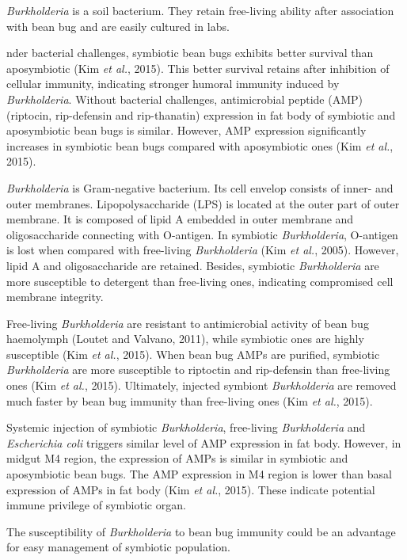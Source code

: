 \documentclass[11pt]{article}
\begin{document}
\begin{sloppypar}
\textit{Burkholderia} is a soil bacterium. 
They retain free-living ability after association with bean bug and are easily cultured in labs.
\par
nder bacterial challenges, symbiotic bean bugs exhibits better survival than aposymbiotic (Kim \textit{et al.}, 2015). 
This better survival retains after inhibition of cellular immunity, indicating stronger humoral immunity induced by \textit{Burkholderia}. 
Without bacterial challenges, antimicrobial peptide (AMP) (riptocin, rip-defensin and rip-thanatin) expression in fat body of symbiotic and aposymbiotic bean bugs is similar. 
However, AMP expression significantly increases in symbiotic bean bugs compared with aposymbiotic ones (Kim \textit{et al.}, 2015).
\par
\textit{Burkholderia} is Gram-negative bacterium. 
Its cell envelop consists of inner- and outer membranes. 
Lipopolysaccharide (LPS) is located at the outer part of outer membrane. 
It is composed of lipid A embedded in outer membrane and oligosaccharide connecting with O-antigen. 
In symbiotic \textit{Burkholderia}, O-antigen is lost when compared with free-living \textit {Burkholderia} (Kim \textit{et al.}, 2005). 
However, lipid A and oligosaccharide are retained. 
Besides, symbiotic \textit{Burkholderia} are more susceptible to detergent than free-living ones, indicating compromised cell membrane integrity.
\par
Free-living \textit{Burkholderia} are resistant to antimicrobial activity of bean bug haemolymph (Loutet and Valvano, 2011), while symbiotic ones are highly susceptible (Kim \textit{et al.}, 2015). 
When bean bug AMPs are purified, symbiotic \textit{Burkholderia} are more susceptible to riptoctin and rip-defensin than free-living ones (Kim \textit{et al.}, 2015). 
Ultimately, injected symbiont \textit{Burkholderia} are removed much faster by bean bug immunity than free-living ones (Kim \textit{et al.}, 2015).
\par
Systemic injection of symbiotic \textit{Burkholderia}, free-living \textit{Burkholderia} and \textit{Escherichia coli} triggers similar level of AMP expression in fat body. 
However, in midgut M4 region, the expression of AMPs is similar in symbiotic and aposymbiotic bean bugs. 
The AMP expression in M4 region is lower than basal expression of AMPs in fat body (Kim \textit{et al.}, 2015). 
These indicate potential immune privilege of symbiotic organ. 
\par
The susceptibility of \textit{Burkholderia} to bean bug immunity could be an advantage for easy management of symbiotic population. 

\end{sloppypar}
\end{document}
